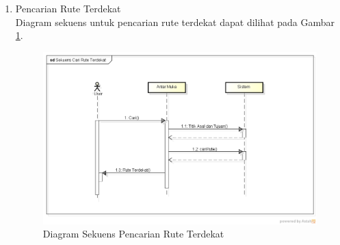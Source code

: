 \begin{enumerate}
  \item Pencarian Rute Terdekat\\
  Diagram sekuens untuk pencarian rute terdekat dapat dilihat pada Gambar
  \ref{fig:sd_rute}.
\begin{figure}[h]
\centering
\includegraphics[scale=0.5]{Gambar/sd_rute}
\caption[Diagram Sekuens Pencarian Rute Terdekat]{Diagram Sekuens Pencarian Rute Terdekat}
\label{fig:sd_rute}
\end{figure}
\end{enumerate}